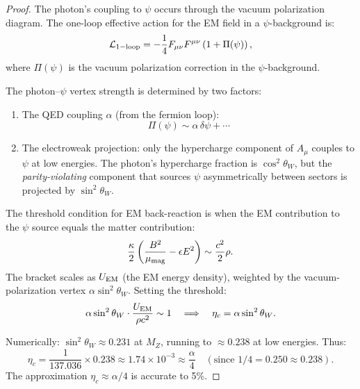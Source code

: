 \documentclass[11pt]{article}
\begin{document}
\begin{proof}
The photon's coupling to $\psi$ occurs through the vacuum polarization diagram.
The one-loop effective action for the EM field in a $\psi$-background is:
\begin{equation}
\mathcal{L}_{\rm 1-loop} = -\frac{1}{4}F_{\mu\nu}F^{\mu\nu}\left(1 + \Pi(\psi)\right),
\end{equation}
where $\Pi(\psi)$ is the vacuum polarization correction in the $\psi$-background.

The photon--$\psi$ vertex strength is determined by two factors:
\begin{enumerate}
\item The QED coupling $\alpha$ (from the fermion loop):
\begin{equation}
\Pi(\psi) \sim \alpha\,\delta\psi + \cdots
\end{equation}
\item The electroweak projection: only the hypercharge component of $A_\mu$
couples to $\psi$ at low energies.  The photon's hypercharge fraction is
$\cos^2\theta_W$, but the \emph{parity-violating} component that sources
$\psi$ asymmetrically between sectors is projected by $\sin^2\theta_W$.
\end{enumerate}

The threshold condition for EM back-reaction is when the EM contribution
to the $\psi$ source equals the matter contribution:
\begin{equation}
\frac{\kappa}{2}\left(\frac{B^2}{\mu_{\rm mag}} - \epsilon E^2\right)
\sim \frac{c^2}{2}\rho.
\end{equation}
The bracket scales as $U_{\rm EM}$ (the EM energy density), weighted by
the vacuum-polarization vertex $\alpha\sin^2\theta_W$.  Setting the
threshold:
\begin{equation}
\alpha\sin^2\theta_W \cdot\frac{U_{\rm EM}}{\rho c^2} \sim 1
\quad\Longrightarrow\quad
\eta_c = \alpha\sin^2\theta_W.
\end{equation}

Numerically: $\sin^2\theta_W \approx 0.231$ at $M_Z$, running to $\approx 0.238$
at low energies.  Thus:
\begin{equation}
\eta_c = \frac{1}{137.036}\times 0.238 \approx 1.74\times 10^{-3}
\approx \frac{\alpha}{4}\quad(\text{since } 1/4 = 0.250 \approx 0.238).
\end{equation}
The approximation $\eta_c \approx \alpha/4$ is accurate to 5\%.
\end{proof}
\end{document}
